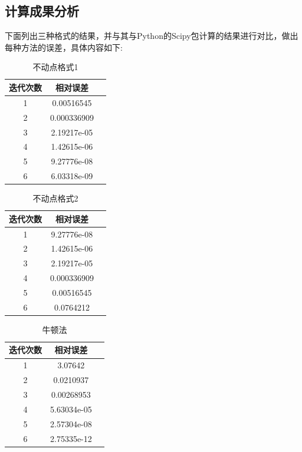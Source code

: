 \documentclass{ctexart}
\begin{document}
\subsection{计算成果分析}
下面列出三种格式的结果，并与其与Python的Scipy包计算的结果进行对比，做出每种方法的误差，具体内容如下:
\begin{center}
    \begin{longtable}{|c|c|c|}
        \caption{不动点格式1}\\
        \hline
        迭代次数& 相对误差\\
        \hline
        1& 0.00516545\\
        \hline
        2& 0.000336909\\
        \hline
        3& 2.19217e-05\\
        \hline
        4& 1.42615e-06\\
        \hline
        5& 9.27776e-08\\
        \hline
        6& 6.03318e-09\\
        \hline
    \end{longtable}
\end{center}
\begin{center}
    \begin{longtable}{|c|c|c|}
        \caption{不动点格式2}\\
        \hline
        迭代次数& 相对误差\\
        \hline
        1& 9.27776e-08\\
        \hline
        2& 1.42615e-06\\
        \hline
        3& 2.19217e-05\\
        \hline
        4& 0.000336909\\
        \hline
        5& 0.00516545\\
        \hline
        6& 0.0764212\\
        \hline        
    \end{longtable}
\end{center}
\begin{center}
    \begin{longtable}{|c|c|c|}
        \caption{牛顿法}\\
        \hline
        迭代次数& 相对误差\\
        \hline
        1& 3.07642\\
        \hline
        2& 0.0210937\\
        \hline
        3& 0.00268953\\
        \hline
        4& 5.63034e-05\\
        \hline
        5& 2.57304e-08\\
        \hline
        6& 2.75335e-12\\
        \hline
    \end{longtable}
\end{center}
\end{document}
